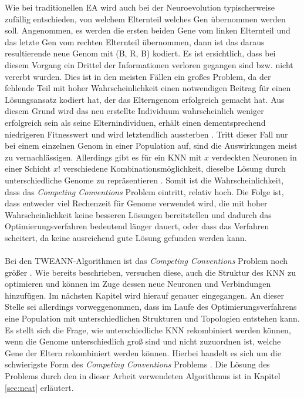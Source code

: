 Wie bei traditionellen \ac{EA} wird auch bei der Neuroevolution typischerweise zufällig entschieden, von welchem Elternteil welches Gen übernommen werden soll. Angenommen, es werden die ersten beiden Gene vom linken Elternteil und das letzte Gen vom rechten Elternteil übernommen, dann ist das daraus resultierende neue Genom mit (B, R, B) kodiert. Es ist ersichtlich, dass bei diesem Vorgang ein Drittel der Informationen verloren gegangen sind bzw. nicht vererbt wurden. Dies ist in den meisten Fällen ein großes Problem, da der fehlende Teil mit hoher Wahrscheinlichkeit einen notwendigen Beitrag für einen Lösungsansatz kodiert hat, der das Elterngenom erfolgreich gemacht hat. Aus diesem Grund wird das neu erstellte Individuum wahrscheinlich weniger erfolgreich sein als seine Elternindividuen, erhält einen dementsprechend niedrigeren Fitnesswert und wird letztendlich aussterben \cite{stanley2002evolving}. Tritt dieser Fall nur bei einem einzelnen Genom in einer Population auf, sind die Auswirkungen meist zu vernachlässigen. Allerdings gibt es für ein \ac{KNN} mit $x$ verdeckten Neuronen in einer Schicht $x!$ verschiedene Kombinationsmöglichkeit, dieselbe Lösung durch unterschiedliche Genome zu repräsentieren \cite{stanley2002evolving}. Somit ist die Wahrscheinlichkeit, dass das \emph{Competing Conventions} Problem eintritt, relativ hoch. Die Folge ist, dass entweder viel Rechenzeit für Genome verwendet wird, die mit hoher Wahrscheinlichkeit keine besseren Lösungen bereitstellen und dadurch das Optimierungsverfahren bedeutend länger dauert, oder dass das Verfahren scheitert, da keine ausreichend gute Lösung gefunden werden kann. 
\\\\
Bei den \ac{TWEANN}-Algorithmen ist das \emph{Competing Conventions} Problem noch größer \cite{stanley2002evolving}. Wie bereits beschrieben, versuchen diese, auch die Struktur des \ac{KNN} zu optimieren und können im Zuge dessen neue Neuronen und Verbindungen hinzufügen. Im nächsten Kapitel wird hierauf genauer eingegangen. An dieser Stelle sei allerdings vorweggenommen, dass im Laufe des Optimierungsverfahrens eine Population mit unterschiedlichen Strukturen und Topologien entstehen kann. Es stellt sich die Frage, wie  unterschiedliche \ac{KNN} rekombiniert werden können, wenn die Genome unterschiedlich groß sind und nicht zuzuordnen ist, welche Gene der Eltern rekombiniert werden können. Hierbei handelt es sich um die schwierigste Form des \emph{Competing Conventions} Problems \cite{stanley2002evolving}. Die Lösung des Problems durch den in dieser Arbeit verwendeten Algorithmus ist in Kapitel \ref{sec:neat} erläutert.

